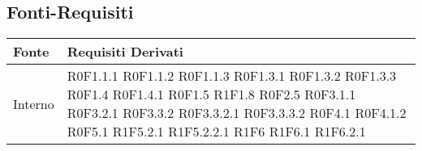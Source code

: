 
	\subsection{Fonti-Requisiti} %
	\label{sub:fonti_requisiti}

	\begin{center}

	\def\arraystretch{1.5}
	\bgroup
	\begin{longtable}{| p{4cm} | p{4cm} |}

		\hline
		\textbf{Fonte} & \textbf{Requisiti Derivati} \\
		\hline

		Interno  &  R0F1.1.1 \newline R0F1.1.2 \newline R0F1.1.3 \newline R0F1.3.1 \newline R0F1.3.2 \newline R0F1.3.3 \newline R0F1.4 \newline R0F1.4.1 \newline R0F1.5 \newline R1F1.8 \newline R0F2.5 \newline R0F3.1.1 \newline R0F3.2.1 \newline R0F3.3.2 \newline R0F3.3.2.1 \newline R0F3.3.3.2 \newline R0F4.1 \newline R0F4.1.2 \newline R0F5.1 \newline R1F5.2.1 \newline R1F5.2.2.1 \newline R1F6 \newline R1F6.1 \newline R1F6.2.1 \n
\end{longtable}
\end{center}
